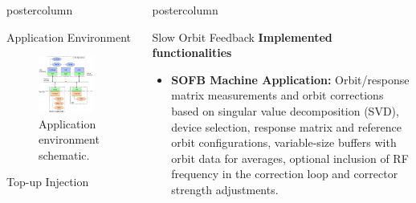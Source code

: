 \documentclass{beamer}
\newlength{\columnheight}
\begin{document}
\begin{frame}
\begin{columns}
\begin{column}{0.45\textwidth}
\begin{beamercolorbox}[center]{postercolumn}
\begin{minipage}{.98\textwidth}
{\begin{myblock}{Application Environment}
\begin{figure}
							\includegraphics[width=0.85\textwidth]{../WEPOPRPO22f1.eps}
							\caption{Application environment schematic.}
						\end{figure}
					\end{myblock}
					\begin{myblock}{Top-up Injection}
					\end{myblock}\vfill
		}\end{minipage}\end{beamercolorbox}
	\end{column}
	\begin{column}{.55\textwidth}
		\begin{beamercolorbox}[center]{postercolumn}
			\begin{minipage}{.98\textwidth} %
				\parbox[t][\columnheight]{\textwidth}{ %
					\begin{myblock}{Slow Orbit Feedback}
						\textbf{Implemented functionalities}
						\begin{itemize}
							\item \textbf{SOFB Machine Application:} Orbit/response matrix measurements and orbit corrections based on singular value decomposition (SVD), device selection, response matrix and reference orbit configurations, variable-size buffers with orbit data for averages, optional inclusion of RF frequency in the correction loop and corrector strength adjustments.

\end{itemize}
\end{myblock}}
\end{minipage}
\end{beamercolorbox}
\end{column}
\end{columns}
\end{frame}
\end{document}

